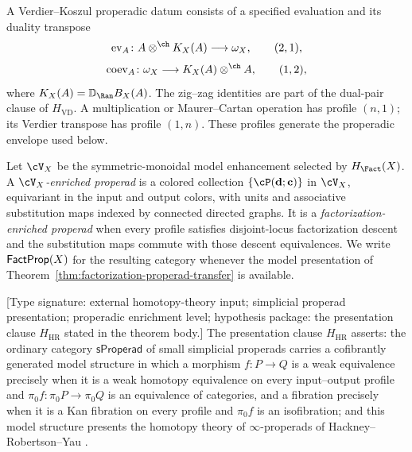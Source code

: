 A Verdier--Koszul properadic datum consists of a specified evaluation
and its duality transpose
\[
 \operatorname{ev}_{A}\colon
 A\otimes^{\ch}K_X(A)\longrightarrow\omega_X,
 \qquad (2,1),
\]
\[
 \operatorname{coev}_{A}\colon
 \omega_X\longrightarrow K_X(A)\otimes^{\ch}A,
 \qquad (1,2),
\]
where $K_X(A)=\mathbb D_{\Ran}B_X(A)$.  The zig--zag identities are
part of the dual-pair clause of $H_{\mathrm{VD}}$.  A multiplication
or Maurer--Cartan operation has profile $(n,1)$; its Verdier transpose
has profile $(1,n)$.  These profiles generate the properadic envelope
used below.

\begin{definition}
\label{def:v1-factorization-properad}
Let $\cV_X$ be the symmetric-monoidal model enhancement selected by
$H_{\Fact}(X)$.  A \emph{$\cV_X$-enriched properad} is a colored
collection $\{\cP(\mathbf d;\mathbf c)\}$ in $\cV_X$, equivariant in
the input and output colors, with units and associative substitution
maps indexed by connected directed graphs.  It is a
\emph{factorization-enriched properad} when every profile satisfies
disjoint-locus factorization descent and the substitution maps commute
with those descent equivalences.  We write $\mathsf{FactProp}(X)$ for the
resulting category whenever the model presentation of
Theorem~\ref{thm:factorization-properad-transfer} is available.
\end{definition}

\begin{theorem}
\label{thm:hackney-robertson-model}
\textup{[Type signature: external homotopy-theory input; simplicial
properad presentation; properadic enrichment level; hypothesis
package: the presentation clause $H_{\mathrm{HR}}$ stated in the
theorem body.]}
The presentation clause $H_{\mathrm{HR}}$ asserts: the ordinary
category $\mathsf{sProperad}$ of small simplicial properads carries a
cofibrantly generated model structure in which a morphism
$f\colon P\to Q$ is a weak equivalence precisely when it is a weak
homotopy equivalence on every input--output profile and
$\pi_0f\colon\pi_0P\to\pi_0Q$ is an equivalence of categories, and a
fibration precisely when it is a Kan fibration on every profile and
$\pi_0f$ is an isofibration; and this model structure presents the
homotopy theory of $\infty$-properads of
Hackney--Robertson--Yau \cite{HRY17}.
\end{theorem}

